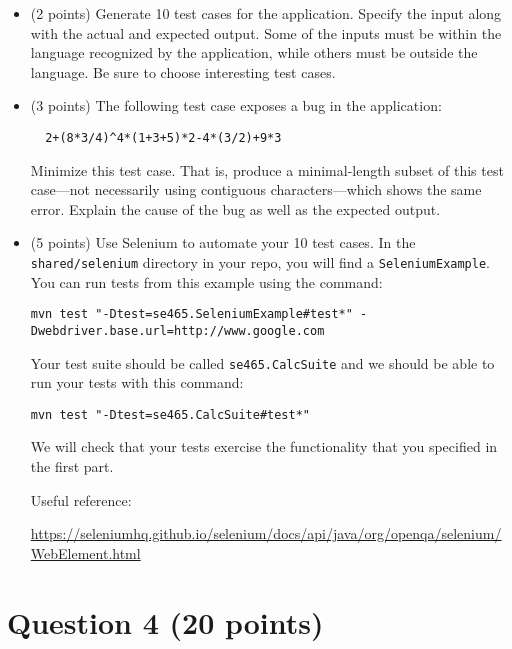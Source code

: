 \documentclass[10pt,hidelinks]{article}
\begin{document}
\begin{itemize}
\item (2 points) Generate 10 test cases for the application. Specify the input along with the actual and expected output. Some of the inputs must be within the language recognized by the application, while others must be outside the language. Be sure to choose interesting test cases.

\item (3 points) The following test case exposes a bug in the application:

\begin{verbatim}
  2+(8*3/4)^4*(1+3+5)*2-4*(3/2)+9*3
\end{verbatim}

Minimize this test case. That is, produce a minimal-length subset of this test case---not necessarily using contiguous characters---which shows the same error. Explain the cause of the bug as well as the expected output.

\item (5 points) Use Selenium to automate your 10 test cases. In the {\tt shared/selenium} directory in your repo, you will find a {\tt SeleniumExample}. You can run tests from this example using the command:

\begin{verbatim}
mvn test "-Dtest=se465.SeleniumExample#test*" -Dwebdriver.base.url=http://www.google.com
\end{verbatim}

Your test suite should be called {\tt se465.CalcSuite} and we should be able to run your tests with this command:

\begin{verbatim}
mvn test "-Dtest=se465.CalcSuite#test*"
\end{verbatim}

We will check that your tests exercise the functionality that you specified in the first part.

Useful reference:

\url{https://seleniumhq.github.io/selenium/docs/api/java/org/openqa/selenium/WebElement.html}

\end{itemize}


\section*{Question 4 (20 points)}
\end{document}

